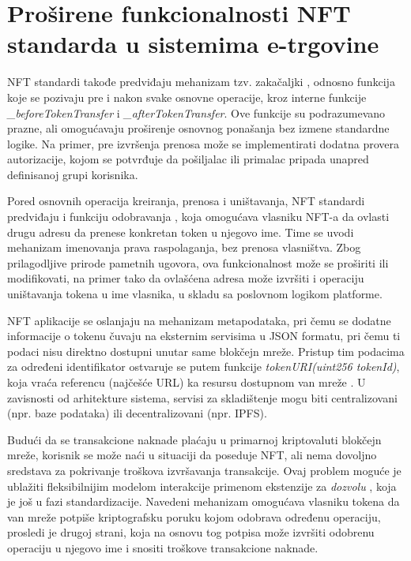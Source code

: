 \section{Proširene funkcionalnosti NFT standarda u sistemima e-trgovine}
NFT standardi takođe predviđaju mehanizam tzv. zakačaljki , odnosno funkcija koje se pozivaju pre i nakon svake osnovne operacije, kroz interne funkcije \textit{\_beforeTokenTransfer} i \textit{\_afterTokenTransfer}. Ove funkcije su podrazumevano prazne, ali omogućavaju proširenje osnovnog ponašanja bez izmene standardne logike. Na primer, pre izvršenja prenosa može se implementirati dodatna provera autorizacije, kojom se potvrđuje da pošiljalac ili primalac pripada unapred definisanoj grupi korisnika.

Pored osnovnih operacija kreiranja, prenosa i uništavanja, NFT standardi predviđaju i funkciju odobravanja , koja omogućava vlasniku NFT-a da ovlasti drugu adresu da prenese konkretan token u njegovo ime. Time se uvodi mehanizam imenovanja prava raspolaganja, bez prenosa vlasništva. Zbog prilagodljive prirode pametnih ugovora, ova funkcionalnost može se proširiti ili modifikovati, na primer tako da ovlašćena adresa može izvršiti i operaciju uništavanja tokena u ime vlasnika, u skladu sa poslovnom logikom platforme.

NFT aplikacije se oslanjaju na mehanizam metapodataka, pri čemu se dodatne informacije o tokenu čuvaju na eksternim servisima u JSON formatu, pri čemu ti podaci nisu direktno dostupni unutar same blokčejn mreže. Pristup tim podacima za određeni identifikator ostvaruje se putem funkcije \textit{tokenURI(uint256 tokenId)}, koja vraća referencu (najčešće URL) ka resursu dostupnom van mreže \cite{salem2025hidden}. U zavisnosti od arhitekture sistema, servisi za skladištenje mogu biti centralizovani (npr. baze podataka) ili decentralizovani (npr. IPFS).

Budući da se transakcione naknade plaćaju u primarnoj kriptovaluti blokčejn mreže, korisnik se može naći u situaciji da poseduje NFT, ali nema dovoljno sredstava za pokrivanje troškova izvršavanja transakcije. Ovaj problem moguće je ublažiti fleksibilnijim modelom interakcije primenom ekstenzije za \textit{dozvolu} \cite{NFTPERMITeip4494} , koja je još u fazi standardizacije. Navedeni mehanizam omogućava vlasniku tokena da van mreže potpiše kriptografsku poruku kojom odobrava određenu operaciju, prosledi je drugoj strani, koja na osnovu tog potpisa može izvršiti odobrenu operaciju u njegovo ime i snositi troškove transakcione naknade.

